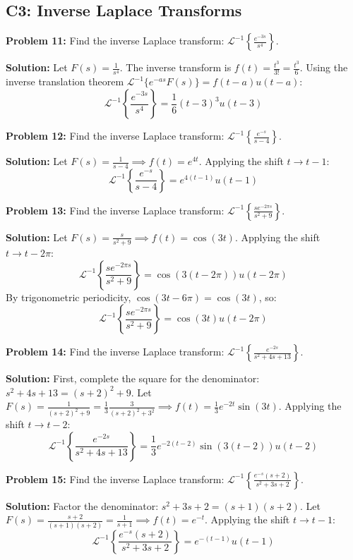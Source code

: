 \documentclass[11pt, letterpaper]{article}
\theoremstyle{definition}
\theoremstyle{remark}
\newcommand{\Lap}{\mathcal{L}}
\begin{document}
\subsection{C3: Inverse Laplace Transforms}

\textbf{Problem 11:} Find the inverse Laplace transform: $\Lap^{-1} \left\{ \frac{e^{-3s}}{s^4} \right\}$.

\textbf{Solution:}
Let $F(s) = \frac{1}{s^4}$. The inverse transform is $f(t) = \frac{t^3}{3!} = \frac{t^3}{6}$.
Using the inverse translation theorem $\Lap^{-1}\{e^{-as}F(s)\} = f(t-a)u(t-a)$:
\[ \Lap^{-1} \left\{ \frac{e^{-3s}}{s^4} \right\} = \frac{1}{6}(t-3)^3 u(t-3) \]

\vspace{1em}
\textbf{Problem 12:} Find the inverse Laplace transform: $\Lap^{-1} \left\{ \frac{e^{-s}}{s-4} \right\}$.

\textbf{Solution:}
Let $F(s) = \frac{1}{s-4} \implies f(t) = e^{4t}$.
Applying the shift $t \to t-1$:
\[ \Lap^{-1} \left\{ \frac{e^{-s}}{s-4} \right\} = e^{4(t-1)} u(t-1) \]

\vspace{1em}
\textbf{Problem 13:} Find the inverse Laplace transform: $\Lap^{-1} \left\{ \frac{s e^{-2\pi s}}{s^2 + 9} \right\}$.

\textbf{Solution:}
Let $F(s) = \frac{s}{s^2+9} \implies f(t) = \cos(3t)$.
Applying the shift $t \to t-2\pi$:
\[ \Lap^{-1} \left\{ \frac{s e^{-2\pi s}}{s^2 + 9} \right\} = \cos(3(t-2\pi)) u(t-2\pi) \]
By trigonometric periodicity, $\cos(3t - 6\pi) = \cos(3t)$, so:
\[ \Lap^{-1} \left\{ \frac{s e^{-2\pi s}}{s^2 + 9} \right\} = \cos(3t) u(t-2\pi) \]

\vspace{1em}
\textbf{Problem 14:} Find the inverse Laplace transform: $\Lap^{-1} \left\{ \frac{e^{-2s}}{s^2 + 4s + 13} \right\}$.

\textbf{Solution:}
First, complete the square for the denominator: $s^2 + 4s + 13 = (s+2)^2 + 9$.
Let $F(s) = \frac{1}{(s+2)^2 + 9} = \frac{1}{3} \frac{3}{(s+2)^2 + 3^2} \implies f(t) = \frac{1}{3} e^{-2t} \sin(3t)$.
Applying the shift $t \to t-2$:
\[ \Lap^{-1} \left\{ \frac{e^{-2s}}{s^2 + 4s + 13} \right\} = \frac{1}{3} e^{-2(t-2)} \sin(3(t-2)) u(t-2) \]

\vspace{1em}
\textbf{Problem 15:} Find the inverse Laplace transform: $\Lap^{-1} \left\{ \frac{e^{-s}(s+2)}{s^2 + 3s + 2} \right\}$.

\textbf{Solution:}
Factor the denominator: $s^2 + 3s + 2 = (s+1)(s+2)$.
Let $F(s) = \frac{s+2}{(s+1)(s+2)} = \frac{1}{s+1} \implies f(t) = e^{-t}$.
Applying the shift $t \to t-1$:
\[ \Lap^{-1} \left\{ \frac{e^{-s}(s+2)}{s^2 + 3s + 2} \right\} = e^{-(t-1)} u(t-1) \]
\end{document}
